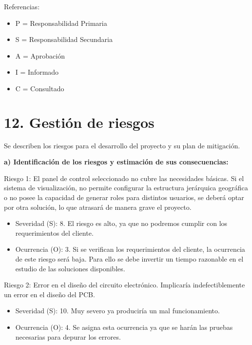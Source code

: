 \documentclass[11pt]{proyecto}
\begin{document}
{\footnotesize
Referencias:
\begin{itemize}
	\item P = Responsabilidad Primaria
	\item S = Responsabilidad Secundaria
	\item A = Aprobación
	\item I = Informado
	\item C = Consultado
\end{itemize}
} %




\section{12. Gestión de riesgos}
\label{sec:riesgos}
Se describen los riesgos para el desarrollo del proyecto y su plan de mitigación.

\textbf{a) Identificación de los riesgos y estimación de sus consecuencias:}
 
Riesgo 1: El panel de control seleccionado no cubre las necesidades básicas. Si el sistema de visualización, no permite configurar la estructura jerárquica geográfica o no posee la capacidad de generar roles para distintos usuarios, se deberá optar por otra solución, lo que atrasará de manera grave el proyecto.
\begin{itemize}
\item Severidad (S): 8. El riesgo es alto, ya que no podremos cumplir con los requerimientos del cliente.
\item Ocurrencia (O): 3. Si se verifican los requerimientos del cliente, la ocurrencia de este riesgo será baja. Para ello se debe invertir un tiempo razonable en el estudio de las soluciones disponibles.
\end{itemize}   

Riesgo 2: Error en el diseño del circuito electrónico. Implicaría indefectiblemente un error en el diseño del PCB.
\begin{itemize}
\item Severidad (S): 10. Muy severo ya produciría un mal funcionamiento. 
\item Ocurrencia (O): 4. Se asigna esta ocurrencia ya que se harán las pruebas necesarias para depurar los errores.
\end{itemize}
\end{document}
